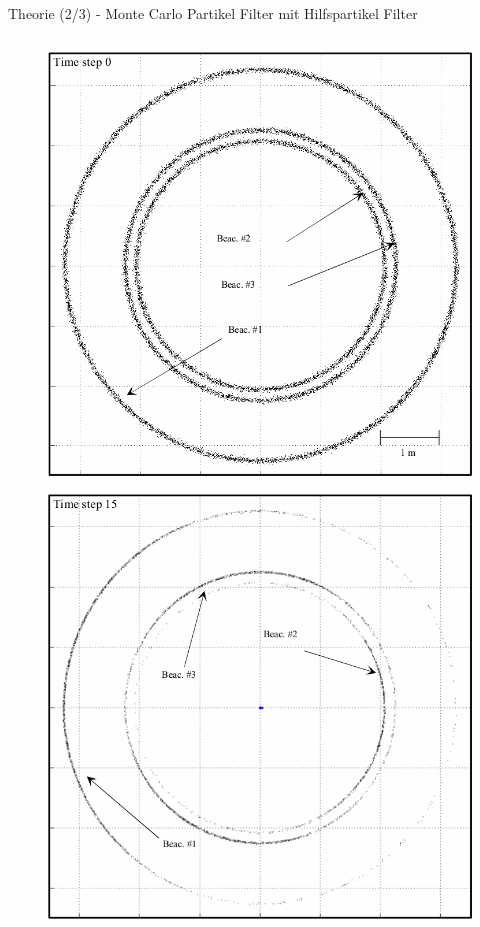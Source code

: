 \documentclass{beamer}
\begin{document}
%
%
\begin{frame}{Theorie (2/3) - Monte Carlo Partikel Filter mit Hilfspartikel Filter}
	\begin{columns}
			\begin{overlayarea}{\textwidth}{.9\textheight}
				\only<1>
				{
					\begin{figure}
						\centering
						\includegraphics[width=\linewidth]{blanco2008pure_fig3e}
						\caption{\cite{blanco2008pure}}
					\end{figure}
				}
				{
					\begin{figure}
						\centering
						\includegraphics[width=\linewidth]{blanco2008pure_fig3f}

\end{figure}}
\end{overlayarea}
\end{columns}
\end{frame}
\end{document}
